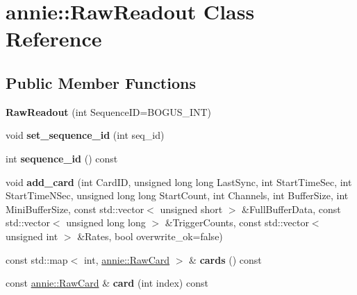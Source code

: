 \hypertarget{classannie_1_1RawReadout}{
\section{annie::RawReadout Class Reference}
\label{classannie_1_1RawReadout}
}
\subsection*{Public Member Functions}
\begin{DoxyCompactItemize}
\item 
\hypertarget{classannie_1_1RawReadout_a66f3a9c85b9413f72c19486903cba555}{
{\bfseries RawReadout} (int SequenceID=BOGUS\_\-INT)}
\label{classannie_1_1RawReadout_a66f3a9c85b9413f72c19486903cba555}

\item 
\hypertarget{classannie_1_1RawReadout_a50f260bfb7e4d0c432068b083bee0ade}{
void {\bfseries set\_\-sequence\_\-id} (int seq\_\-id)}
\label{classannie_1_1RawReadout_a50f260bfb7e4d0c432068b083bee0ade}

\item 
\hypertarget{classannie_1_1RawReadout_a00fa88e705b67adce1287addd44b5c39}{
int {\bfseries sequence\_\-id} () const }
\label{classannie_1_1RawReadout_a00fa88e705b67adce1287addd44b5c39}

\item 
\hypertarget{classannie_1_1RawReadout_a024f428f54d2aa60e3bb362a65fa52db}{
void {\bfseries add\_\-card} (int CardID, unsigned long long LastSync, int StartTimeSec, int StartTimeNSec, unsigned long long StartCount, int Channels, int BufferSize, int MiniBufferSize, const std::vector$<$ unsigned short $>$ \&FullBufferData, const std::vector$<$ unsigned long long $>$ \&TriggerCounts, const std::vector$<$ unsigned int $>$ \&Rates, bool overwrite\_\-ok=false)}
\label{classannie_1_1RawReadout_a024f428f54d2aa60e3bb362a65fa52db}

\item 
\hypertarget{classannie_1_1RawReadout_af5d43b02fbde95e9811a5dd02cdb259d}{
const std::map$<$ int, \hyperlink{classannie_1_1RawCard}{annie::RawCard} $>$ \& {\bfseries cards} () const }
\label{classannie_1_1RawReadout_af5d43b02fbde95e9811a5dd02cdb259d}

\item 
\hypertarget{classannie_1_1RawReadout_a83511d054f76dfb88813d9bf6e916b9c}{
const \hyperlink{classannie_1_1RawCard}{annie::RawCard} \& {\bfseries card} (int index) const }
\label{classannie_1_1RawReadout_a83511d054f76dfb88813d9bf6e916b9c}


\end{DoxyCompactItemize}

